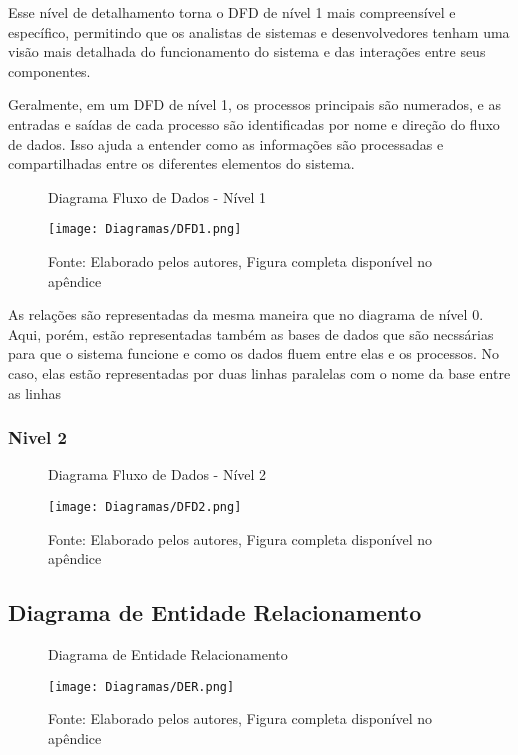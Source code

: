 Esse nível de detalhamento torna o DFD de nível 1 mais compreensível e específico, permitindo que os analistas de sistemas e desenvolvedores tenham uma visão mais detalhada do funcionamento do sistema e das interações entre seus componentes.

Geralmente, em um DFD de nível 1, os processos principais são numerados, e as entradas e saídas de cada processo são identificadas por nome e direção do fluxo de dados. Isso ajuda a entender como as informações são processadas e compartilhadas entre os diferentes elementos do sistema.

\begin{figure}[H]
    \centering
    \caption{Diagrama Fluxo de Dados - Nível 1}
    \label{fig:DFD1}
    \texttt{[image: Diagramas/DFD1.png]}\\
    \caption*{Fonte: Elaborado pelos autores, Figura completa disponível no apêndice}
\end{figure}

As relações são representadas da mesma maneira que no diagrama de nível 0. Aqui, porém, estão representadas também as bases de dados que são necssárias para que o sistema funcione e como os dados fluem entre elas e os processos. No caso, elas estão representadas por duas linhas paralelas com o nome da base entre as linhas


\subsubsection{Nivel 2}

\begin{figure}[H]
    \centering
    \caption{Diagrama Fluxo de Dados - Nível 2}
    \label{fig:DFD2}
    \texttt{[image: Diagramas/DFD2.png]}\\
    \caption*{Fonte: Elaborado pelos autores, Figura completa disponível no apêndice}
\end{figure}


\subsection{Diagrama de Entidade Relacionamento}

\begin{figure}[H]
    \centering
    \caption{Diagrama de Entidade Relacionamento}
    \label{fig:DER}
    \texttt{[image: Diagramas/DER.png]}\\
    \caption*{Fonte: Elaborado pelos autores, Figura completa disponível no apêndice}
\end{figure}

